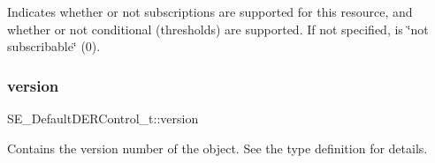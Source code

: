 Indicates whether or not subscriptions are supported for this resource, and whether or not conditional (thresholds) are supported. If not specified, is \char`\"{}not subscribable\char`\"{} (0). \mbox{\label{group__DefaultDERControl_ga2f2e8ea1c9828a1cdbc5080cd39e008f}} 
\subsubsection{\texorpdfstring{version}{version}}
{\footnotesize\ttfamily S\+E\+\_\+\+Default\+D\+E\+R\+Control\+\_\+t\+::version}

Contains the version number of the object. See the type definition for details. 